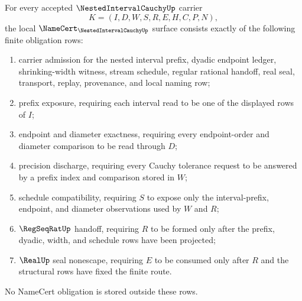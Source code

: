 \begin{theorem}
\label{thm:nested-interval-cauchy-namecert-obligations}
For every accepted $\NestedIntervalCauchyUp$ carrier
$$
K=(I,D,W,S,R,E,H,C,P,N),
$$
the local $\NameCert_{\NestedIntervalCauchyUp}$ surface consists exactly of the following finite obligation rows:
\begin{enumerate}
\item carrier admission for the nested interval prefix, dyadic endpoint ledger, shrinking-width witness, stream schedule, regular rational handoff, real seal, transport, replay, provenance, and local naming row;
\item prefix exposure, requiring each interval read to be one of the displayed rows of $I$;
\item endpoint and diameter exactness, requiring every endpoint-order and diameter comparison to be read through $D$;
\item precision discharge, requiring every Cauchy tolerance request to be answered by a prefix index and comparison stored in $W$;
\item schedule compatibility, requiring $S$ to expose only the interval-prefix, endpoint, and diameter observations used by $W$ and $R$;
\item $\RegSeqRatUp$ handoff, requiring $R$ to be formed only after the prefix, dyadic, width, and schedule rows have been projected;
\item $\RealUp$ seal nonescape, requiring $E$ to be consumed only after $R$ and the structural rows have fixed the finite route.
\end{enumerate}
No NameCert obligation is stored outside these rows.
\end{theorem}
